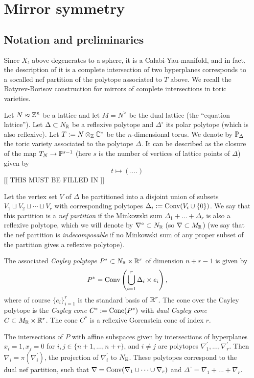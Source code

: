 \documentclass[11pt, english]{article}
\begin{document}
\section{Mirror symmetry}

\subsection{Notation and preliminaries}

Since $X_t$ above degenerates to a sphere, it is a Calabi-Yau-manifold, and in fact, the description of it is a complete intersection of two hyperplanes corresponds to a socalled nef partition of the polytope associated to $T$ above. We recall the Batyrev-Borisov construction for mirrors of complete intersections in toric varieties. 

Let $N \approx \mathbb{Z}^n$ be a lattice and let $M=N^\vee$ be the dual lattice (the ``equation lattice''). Let $\Delta \subset N_{\mathbb{R}}$ be a reflexive polytope and $\Delta^\circ$ its polar polytope (which is also reflexive). Let $T:=N \otimes_{\mathbb{Z}} \mathbb{C}^\ast$ be the $n$-dimensional torus. We denote by $\mathbb{P}_\Delta$ the toric variety associated to the polytope $\Delta$.   It can be described as the closure of the map $T_N \to \mathbb{P}^{s-1}$ (here $s$ is the number of vertices of lattice points of $\Delta$) given by
\[
t \mapsto \left( .... \right)
\]
[[ THIS MUST BE FILLED IN ]]

Let the vertex set $V$ of $\Delta$ be partitioned into a disjoint union of subsets $V_1 \sqcup V_2 \sqcup \cdots \sqcup V_r$ with corresponding polytopes $\Delta_i := \operatorname{Conv}( V_i \cup \{ 0\})$. We say that this partition is a \emph{nef partition} if the Minkowski sum $ \Delta_1 +\ldots+\Delta_r$ is also a reflexive polytope, which we will denote by $\nabla^\circ \subset N_{\mathbb{R}}$ (so $\nabla \subset M_{\mathbb{R}}$) (we say that the nef partition is \emph{indecomposable} if no Minkowski sum of any proper subset of the partition gives a reflexive polytope).

The associated \emph{Cayley polytope} $P^\ast \subset N_{\mathbb{R}} \times \mathbb{R}^r$ of dimension $n+r-1$ is given by 
\[
P^\ast = \operatorname{Conv} \left( \bigcup_{i=1}^r \Delta_i \times e_i \right),
\]
where of course $\{e_i\}_{i=1}^r$ is the standard basis of $\mathbb{R}^r$. The cone over the Cayley polytope is the \emph{Cayley cone} $C^\ast := \operatorname{Cone}(P^\ast)$ with \emph{dual Cayley cone} $C \subset M_{\mathbb{R}} \times \mathbb{R}^r$. The cone $C^\ast$ is a reflexive Gorenstein cone of index $r$.

The intersections of $P$ with affine subspaces given by intersections of hyperplanes $x_i=1,x_j=0$ for $i,j \in \{n+1,\ldots, n+r\}$, and $i\neq j$ are polytopes $\nabla_1^\prime,\ldots, \nabla_r^\prime$. Then $\nabla_i = \pi(\nabla_i^\prime)$, the projection of $\nabla_i^\prime$ to $N_{\mathbb{R}}$. These polytopes correspond to the dual nef partition, such that $\nabla = \operatorname{Conv}(\nabla_1 \cup \cdots \cup \nabla_r)$ and $\Delta^\circ = \nabla_1 + \ldots + \nabla_r$. 
\end{document}
